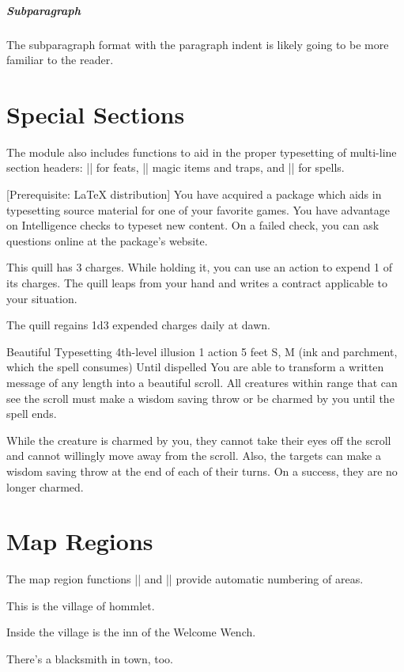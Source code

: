 \documentclass[10pt,twoside,twocolumn,openany,nodepracetedcode]{dndbook}
\begin{document}
\subparagraph{Subparagraph}
The subparagraph format with the paragraph indent is likely going to be more familiar to the reader.

\section{Special Sections}
The module also includes functions to aid in the proper typesetting of multi-line section headers: |\DndFeatHeader| for feats, |\DndItemHeader| magic items and traps, and |\DndSpellHeader| for spells.

[Prerequisite: \LaTeX{} distribution]
You have acquired a package which aids in typesetting source material for one of your favorite games. You have advantage on Intelligence checks to typeset new content. On a failed check, you can ask questions online at the package's website.

This quill has 3 charges. While holding it, you can use an action to expend 1 of its charges. The quill leaps from your hand and writes a contract applicable to your situation.

The quill regains 1d3 expended charges daily at dawn.

\DndSpellHeader%
  {Beautiful Typesetting}
  {4th-level illusion}
  {1 action}
  {5 feet}
  {S, M (ink and parchment, which the spell consumes)}
  {Until dispelled}
You are able to transform a written message of any length into a beautiful scroll. All creatures within range that can see the scroll must make a wisdom saving throw or be charmed by you until the spell ends.

While the creature is charmed by you, they cannot take their eyes off the scroll and cannot willingly move away from the scroll. Also, the targets can make a wisdom saving throw at the end of each of their turns. On a success, they are no longer charmed.

\section{Map Regions}
The map region functions |\DndArea| and |\DndSubArea| provide automatic numbering of areas.

This is the village of hommlet.

Inside the village is the inn of the Welcome Wench.

There's a blacksmith in town, too.
\end{document}

